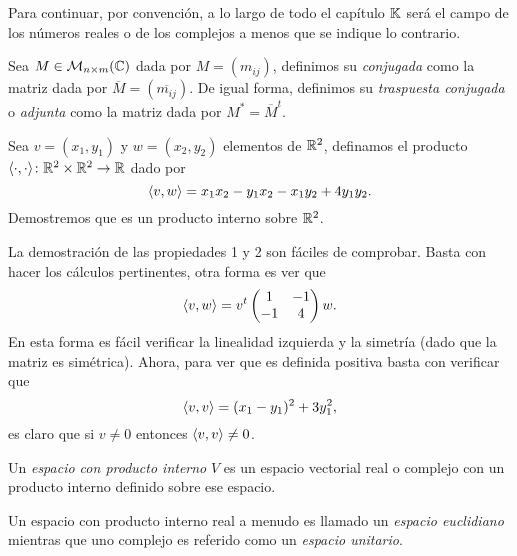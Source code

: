 Para continuar, por convención, a lo largo de todo el capítulo $\mathbb{K}$ será el campo de los números reales o de los complejos a menos que se indique lo contrario.

\begin{defi}
  Sea $M \in \mathcal{M}_{n\times m}(\mathbb{C})$ dada por $M = (m_{ij})$, definimos su \emph{conjugada} como la matriz dada por $\overline{M} = (\overline{m_{ij}})$. De igual forma, definimos su \emph{traspuesta conjugada} o \emph{adjunta} como la matriz dada por $M^* = \overline{M}^t$.
\end{defi}

\begin{example}
  Sea $v = (x_1, y_1)$ y $w = (x_2, y_2)$ elementos de $\mathbb{R}^2$, definamos el producto $\langle\cdot,\cdot\rangle\colon \mathbb{R}^2 \times \mathbb{R}^2 \to \mathbb{R}$ dado por
    \[ \langle v,w\rangle = x_1 x_2 - y_1x_2 - x_1y_2 + 4y_1y_2. \]
  Demostremos que es un producto interno sobre $\mathbb{R}^2$.

  \examplesolution

  La demostración de las propiedades 1 y 2 son fáciles de comprobar. Basta con hacer los cálculos pertinentes, otra forma es ver que 
    \[
      \langle v,w\rangle = v^t \begin{pmatrix}
        1 & -1 \\ -1 & 4
      \end{pmatrix} w.
    \]
  En esta forma es fácil verificar la linealidad izquierda y la simetría (dado que la matriz es simétrica). Ahora, para ver que es definida positiva basta con verificar que
   \[
     \langle v,v\rangle = (x_1 - y_1)^2 + 3 y_1^2,
   \]
   es claro que si $v \neq 0$ entonces $\langle v,v\rangle \neq 0$.
\end{example}

\begin{defi}
  Un \emph{espacio con producto interno} $V$ es un espacio vectorial real o complejo con un producto interno definido sobre ese espacio.
\end{defi}

Un espacio con producto interno real a menudo es llamado un \emph{espacio euclidiano} mientras que uno complejo es referido como un \emph{espacio unitario}.